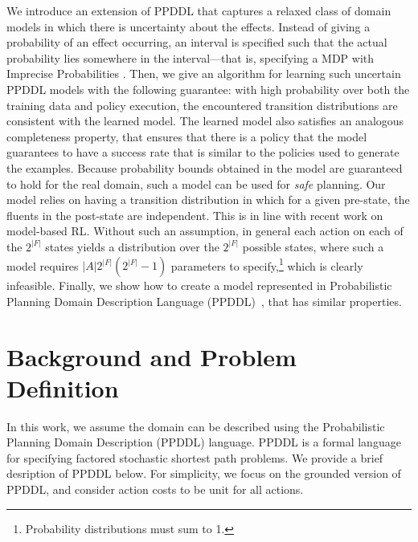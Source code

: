 \documentclass[letterpaper]{article} %
\begin{document}
We introduce an extension of PPDDL that captures a relaxed class of domain models in which there is uncertainty about the effects. Instead of giving a probability of an effect occurring, an interval is specified such that the actual probability lies somewhere in the interval---that is, specifying a MDP with Imprecise Probabilities \cite{satia1973markovian}. Then, we give an algorithm for learning such uncertain PPDDL models with the following guarantee: with high probability over both the training data and policy execution, the encountered transition distributions are consistent with the learned model. The learned model also satisfies an analogous completeness property, that ensures that there is a policy that the model guarantees to have a success rate that is similar to the policies used to generate the examples. Because probability bounds obtained in the model are guaranteed to hold for the real domain, such a model can be used for \emph{safe} planning. 
Our model relies on having a transition distribution in which for a given pre-state, the fluents in the post-state are independent. 
This is in line with recent work on model-based RL. Without such an assumption, in general each action on each of the $2^{|F|}$ states yields a distribution over the $2^{|F|}$ possible states, where such a model requires $|A|2^{|F|}(2^{|F|}-1)$ parameters to specify,\footnote{Probability distributions must sum to 1.} which is clearly infeasible.
Finally, we show how to create a model represented in Probabilistic Planning Domain Description Language (PPDDL)~\cite{younes2004ppddl1}, that has similar properties. 


 


\section{Background and Problem Definition}



In this work, we assume the domain can be described using the Probabilistic Planning Domain Description (PPDDL) language. 
PPDDL is a formal language for specifying factored stochastic shortest path problems. We provide a brief desription of PPDDL below. 
For simplicity, we focus on the grounded version of PPDDL, and consider action costs to be unit for all actions. 
\end{document}
